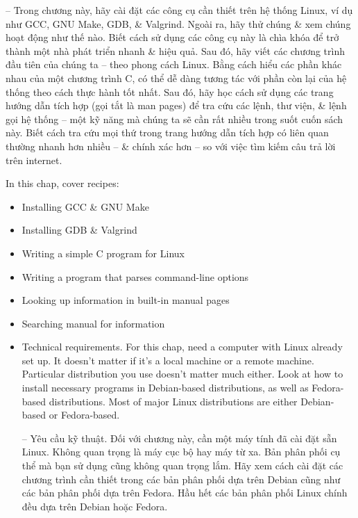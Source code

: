 \documentclass{article}
\begin{document}
\begin{itemize}
    -- Trong chương này, hãy cài đặt các công cụ cần thiết trên hệ thống Linux, ví dụ như GCC, GNU Make, GDB, \& Valgrind. Ngoài ra, hãy thử chúng \& xem chúng hoạt động như thế nào. Biết cách sử dụng các công cụ này là chìa khóa để trở thành một nhà phát triển nhanh \& hiệu quả. Sau đó, hãy viết các chương trình đầu tiên của chúng ta -- theo phong cách Linux. Bằng cách hiểu các phần khác nhau của một chương trình C, có thể dễ dàng tương tác với phần còn lại của hệ thống theo cách thực hành tốt nhất. Sau đó, hãy học cách sử dụng các trang hướng dẫn tích hợp (gọi tắt là man pages) để tra cứu các lệnh, thư viện, \& lệnh gọi hệ thống -- một kỹ năng mà chúng ta sẽ cần rất nhiều trong suốt cuốn sách này. Biết cách tra cứu mọi thứ trong trang hướng dẫn tích hợp có liên quan thường nhanh hơn nhiều -- \& chính xác hơn -- so với việc tìm kiếm câu trả lời trên internet.
    
    In this chap, cover recipes:
    \begin{itemize}
        \item Installing GCC \& GNU Make
        \item Installing GDB \& Valgrind
        \item Writing a simple C program for Linux
        \item Writing a program that parses command-line options
        \item Looking up information in built-in manual pages
        \item Searching manual for information
    \end{itemize}
    
    \begin{itemize}
        \item {\sf Technical requirements.} For this chap, need a computer with Linux already set up. It doesn't matter if it's a local machine or a remote machine. Particular distribution you use doesn't matter much either. Look at how to install necessary programs in Debian-based distributions, as well as Fedora-based distributions. Most of major Linux distributions are either Debian-based or Fedora-based.
        
        -- {\sf Yêu cầu kỹ thuật.} Đối với chương này, cần một máy tính đã cài đặt sẵn Linux. Không quan trọng là máy cục bộ hay máy từ xa. Bản phân phối cụ thể mà bạn sử dụng cũng không quan trọng lắm. Hãy xem cách cài đặt các chương trình cần thiết trong các bản phân phối dựa trên Debian cũng như các bản phân phối dựa trên Fedora. Hầu hết các bản phân phối Linux chính đều dựa trên Debian hoặc Fedora.
        

\end{itemize}
\end{itemize}
\end{document}

